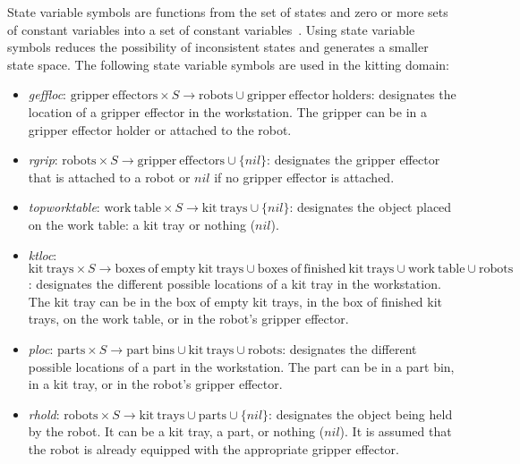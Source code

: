 State variable symbols are functions from the set of states and zero or more sets of constant variables into a set of constant variables~\cite{NAU.2004}. Using state variable symbols reduces the possibility of inconsistent states and generates a smaller state space. The following state variable symbols are used in the kitting domain:

\begin{small}
\begin{itemize}
\item \emph{geffloc}: $\mathrm{gripper\ effectors}\times S\rightarrow\mathrm{robots} \cup \mathrm{gripper\ effector\ holders}$: designates the location of a gripper effector in the workstation. The gripper can be in a gripper effector holder or attached to the robot.

\item \emph{rgrip}: $\mathrm{robots}\times S\rightarrow\mathrm{gripper\ effectors} \cup \lbrace nil\rbrace$: designates the gripper effector that is attached to a robot or $nil$ if no gripper effector is attached.

\item \emph{topworktable}: $\mathrm{work\ table}\times S\rightarrow\mathrm{kit\ trays} \cup \lbrace nil\rbrace$: designates the object placed on the work table: a kit tray or nothing ($nil$).

\item \emph{ktloc}: $\mathrm{kit\ trays}\times S\rightarrow\mathrm{boxes\ of\ empty\ kit\ trays} \cup \mathrm{boxes\ of\ finished\ kit\ trays} \cup \mathrm{work\ table} \cup \mathrm{robots}$: designates the different possible locations of a kit tray in the workstation. The kit tray can be in the box of empty kit trays, in the box of finished kit trays, on the work table, or in the robot's gripper effector.

\item \emph{ploc}: $\mathrm{parts}\times S\rightarrow\mathrm{part\ bins} \cup \mathrm{kit\ trays} \cup \mathrm{robots}$: designates the different possible locations of a part in the workstation. The part can be in a part bin, in a kit tray, or in the robot's gripper effector.

\item \emph{rhold}: $\mathrm{robots}\times S\rightarrow \mathrm{kit\ trays} \cup \mathrm{parts} \cup \lbrace nil\rbrace$: designates the object being held by the robot. It can be a kit tray, a part, or nothing ($nil$). It is assumed that the robot is already equipped with the appropriate gripper effector.


\end{itemize}
\end{small}
